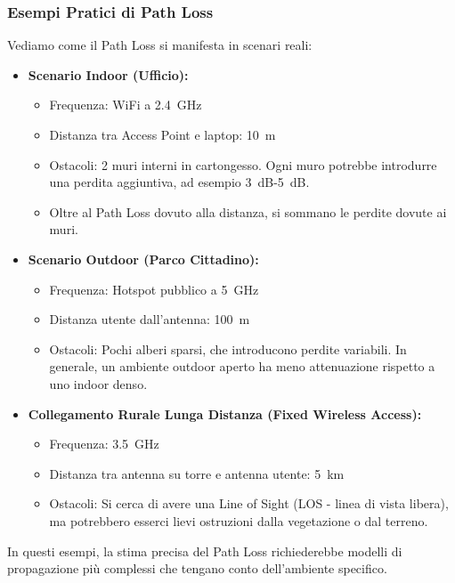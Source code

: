 \subsubsection{Esempi Pratici di Path Loss}
Vediamo come il Path Loss si manifesta in scenari reali:
\begin{itemize}
    \item \textbf{Scenario Indoor (Ufficio):}
    \begin{itemize}
        \item Frequenza: WiFi a \SI{2.4}{\giga\hertz}
        \item Distanza tra Access Point e laptop: \SI{10}{\meter}
        \item Ostacoli: 2 muri interni in cartongesso. Ogni muro potrebbe introdurre una perdita aggiuntiva, ad esempio \SI{3}{dB}-\SI{5}{dB}.
        \item Oltre al Path Loss dovuto alla distanza, si sommano le perdite dovute ai muri.
    \end{itemize}
    
    \item \textbf{Scenario Outdoor (Parco Cittadino):}
    \begin{itemize}
        \item Frequenza: Hotspot pubblico a \SI{5}{\giga\hertz}
        \item Distanza utente dall'antenna: \SI{100}{\meter}
        \item Ostacoli: Pochi alberi sparsi, che introducono perdite variabili. In generale, un ambiente outdoor aperto ha meno attenuazione rispetto a uno indoor denso.
    \end{itemize}
    
    \item \textbf{Collegamento Rurale Lunga Distanza (Fixed Wireless Access):}
    \begin{itemize}
        \item Frequenza: \SI{3.5}{\giga\hertz}
        \item Distanza tra antenna su torre e antenna utente: \SI{5}{\kilo\meter}
        \item Ostacoli: Si cerca di avere una Line of Sight (LOS - linea di vista libera), ma potrebbero esserci lievi ostruzioni dalla vegetazione o dal terreno.
    \end{itemize}
\end{itemize}
In questi esempi, la stima precisa del Path Loss richiederebbe modelli di propagazione più complessi che tengano conto dell'ambiente specifico.

